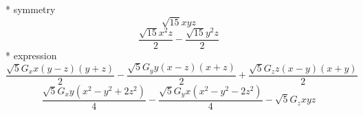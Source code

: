 \documentclass[fleqn,8pt]{jsarticle}
\begin{document}
\noindent\quad ** symmetry
\begin{dmath*}
\sqrt{15} x y z
\end{dmath*}
\begin{dmath*}
\frac{\sqrt{15} x^{2} z}{2} - \frac{\sqrt{15} y^{2} z}{2}
\end{dmath*}
\noindent\quad ** expression
\begin{dmath*}
\frac{\sqrt{5} G_{x} x \left(y - z\right) \left(y + z\right)}{2} - \frac{\sqrt{5} G_{y} y \left(x - z\right) \left(x + z\right)}{2} + \frac{\sqrt{5} G_{z} z \left(x - y\right) \left(x + y\right)}{2}
\end{dmath*}
\begin{dmath*}
\frac{\sqrt{5} G_{x} y \left(x^{2} - y^{2} + 2 z^{2}\right)}{4} - \frac{\sqrt{5} G_{y} x \left(x^{2} - y^{2} - 2 z^{2}\right)}{4} - \sqrt{5} G_{z} x y z
\end{dmath*}
\end{document}
